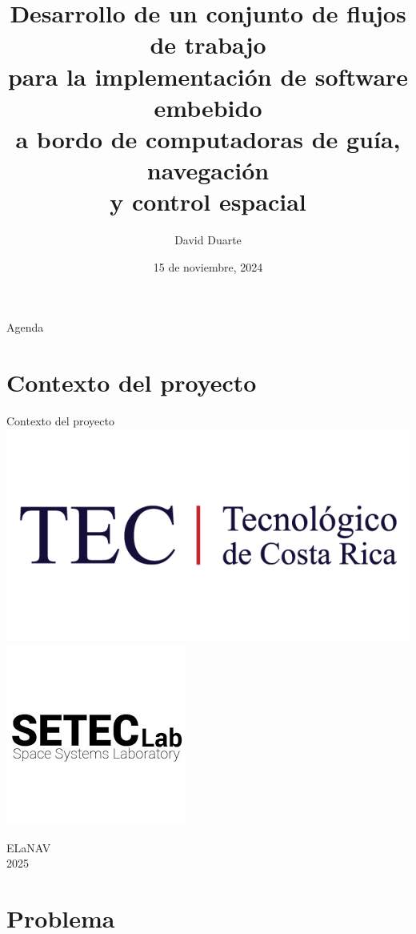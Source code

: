\documentclass[10pt,aspectratio=169]{beamer} %
\title[Proyecto Final de Graduación]{Desarrollo de un conjunto de flujos de trabajo \\
                                  para la implementación de software embebido \\ 
                                  a bordo de computadoras de guía, navegación \\
                                  y control espacial}
\institute[TEC]{Escuela de Ingeniería Electrónica \\ Tecnológico de Costa Rica}
\date[Noviembre 2023]{15 de noviembre, 2024}
\author[D.\ Duarte]{David Duarte}
\begin{document}
\graphicspath{{./}{./fig/}}

\begin{frame}
  \titlepage
\end{frame}


\begin{frame}{Agenda}
  \tableofcontents
\end{frame}

\section{Contexto del proyecto}

\begin{frame}{Contexto del proyecto}
    \centering
    \includegraphics[scale=0.2]{logos/tec.png} \hfill
    \includegraphics[scale=0.3]{logos/seteclab.png} \hfill
    \parbox[c][3cm][c]{0.3\textwidth}{\centering ELaNAV \\ 2025}
\end{frame}

\section{Problema}
\end{document}
